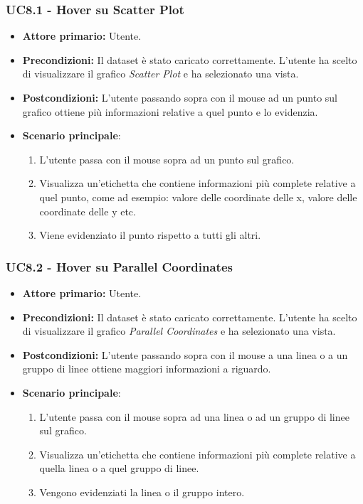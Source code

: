 \subsubsection{UC8.1 - Hover su Scatter Plot}
\label{sec:UC8.1}
\begin{itemize}
    \item \textbf{Attore primario:} Utente.
    \item \textbf{Precondizioni:} Il dataset è stato caricato correttamente. L'utente ha scelto di visualizzare il grafico \textit{Scatter Plot} e ha selezionato una vista.
    \item \textbf{Postcondizioni:} L'utente passando sopra con il mouse ad un punto sul grafico ottiene più informazioni relative a quel punto e lo evidenzia.
    \item \textbf{Scenario principale}: 
    \begin{enumerate}
		\item L'utente passa con il mouse sopra ad un punto sul grafico.
		\item Visualizza un'etichetta che contiene informazioni più complete relative a quel punto, come ad esempio: valore delle coordinate delle x, valore delle coordinate delle y etc. 
		\item Viene evidenziato il punto rispetto a tutti gli altri.
	\end{enumerate}
\end{itemize}

\subsubsection{UC8.2 - Hover su Parallel Coordinates}
\label{sec:UC8.2}
\begin{itemize}
    \item \textbf{Attore primario:} Utente.
    \item \textbf{Precondizioni:} Il dataset è stato caricato correttamente. L'utente ha scelto di visualizzare il grafico \textit{Parallel Coordinates} e ha selezionato una vista.
    \item \textbf{Postcondizioni:} L'utente passando sopra con il mouse a una linea o a un gruppo di linee ottiene maggiori informazioni a riguardo.
    \item \textbf{Scenario principale}:
    \begin{enumerate}
		\item L'utente passa con il mouse sopra ad una linea o ad un gruppo di linee sul grafico.
		\item Visualizza un'etichetta che contiene informazioni più complete relative a quella linea o a quel gruppo di linee.
		\item Vengono evidenziati la linea o il gruppo intero.
	\end{enumerate}
\end{itemize}

